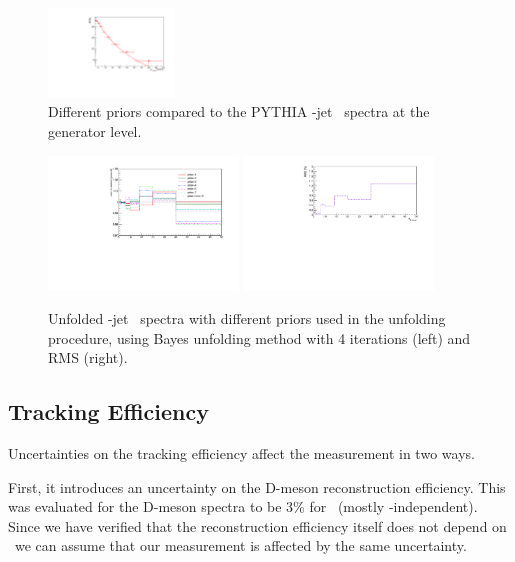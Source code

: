 \begin{figure}[bth]
\includegraphics[width=0.3\textwidth]{pPbcuts_2sig/unfolding/unfoldedSpectrum_prior8}
\caption{Different priors compared to the PYTHIA \Dzero-jet \pt\ spectra at the generator level.}
\label{fig:UnfSpec_pPb_Dzero_priors_all}
\end{figure}

\begin{figure}[bth]
\centering
\includegraphics[width=0.45\textwidth]{pPbcuts_2sig/unfolding/UnfoldingPriorsComparison_ratio}
\includegraphics[width=0.45\textwidth]{pPbcuts_2sig/unfolding/UnfoldingPriorsComparison_rms}
\caption{Unfolded \Dzero-jet \pt\ spectra with different priors used in the unfolding procedure, using Bayes unfolding method with 4 iterations (left) and RMS (right).}
\label{fig:UnfSpec_pPb_Dzero_priors}
\end{figure}


\subsection{Tracking Efficiency}

Uncertainties on the tracking efficiency affect the measurement in two ways. 

First, it introduces an uncertainty on the D-meson reconstruction efficiency. This was evaluated for the D-meson spectra to be 3\% for \Dzero\ (mostly \pt-independent). Since we have verified that the reconstruction efficiency itself does not depend on \ptchjet\ we can assume that our measurement is affected by the same uncertainty.

